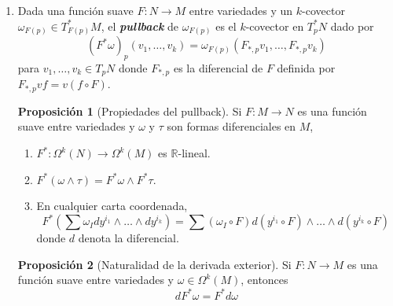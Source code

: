 \documentclass[spanish]{article}
\theoremstyle{definition}
\newtheorem*{prop}{Proposición}
\newtheorem*{obs}{Observación}
\newcommand{\R}{\mathbb{R}}
\newcommand{\Cinf}{C^\infty}
\begin{document}
\begin{enumerate}
		
		\item Dada una función suave $F:N\to M$ entre variedades y un $k$-covector $\omega_{F(p)}\in T^*_{F(p)}M$, el \textbf{\textit{pullback}} de $\omega_{F(p)}$ es el $k$-covector en $T_p^*N$ dado por
		\[(F^*\omega)_p(v_1,\ldots,v_k)=\omega_{F(p)}(F_{*,p}v_1,\ldots,F_{*,p}v_k)\]
		para $v_1,\ldots,v_k\in T_pN$ donde $F_{*,p}$ es la diferencial de $F$ definida por $F_{*,p}vf=v(f\circ F)$.
		
		
		\begin{prop}[Propiedades del pullback]
			Si $F:M\to N$ es una función suave entre variedades y $\omega$ y $\tau$ son formas diferenciales en $M$,
			\begin{enumerate}
				\item $F^*:\Omega^k(N)\to\Omega^k(M)$ es $\R$-lineal.
				\item $F^*(\omega\wedge\tau)=F^*\omega\wedge F^*\tau$.
				\item En cualquier carta coordenada,
				\[F^*\left(\sum\omega_Idy^{i_1}\wedge\ldots\wedge dy^{i_k}\right)=\sum(\omega_I\circ F)d(y^{i_1}\circ F)\wedge\ldots\wedge d(y^{i_k}\circ F)\]
				donde $d$ denota la diferencial.
			\end{enumerate}
		\end{prop}
		
		\begin{prop}[Naturalidad de la derivada exterior]
			Si $F:N\to M$ es una función suave entre variedades y $\omega\in\Omega^k(M)$, entonces
			\[dF^*\omega=F^*d\omega\]
		\end{prop}
		
		
		
		
	\end{enumerate}
	\iffalse
	\begin{obs}[Tres formas de ver la derivada de una función real-valuada]
		Sea $f\in\Cinf(M)$. Los siguientes tres objetos están en correspondencia:
		\begin{enumerate}
			\item La diferencial $f_{*,p}:T_pM\to T_{f(p)}\R$ que manda $v$ al vector $f_{*,p}v$ dado por $\Cinf(\R)\ni g\mapsto v(g\circ f)$.
			\item La 1-forma $df\in \Omega^1(M)$ obtenida mediante la derivada exterior de $f$, definida por $df(v)=vf$, evaluada en $p$.
			\item La función que a una curva $\gamma:(-\varepsilon,\varepsilon)\to M$ con $\gamma(0)=p$ y $\gamma'(0)=v$ le asocia el número real $(f\circ \gamma)'(0)$.
		\end{enumerate}
	\end{obs}
	\fi
	
\end{document}
